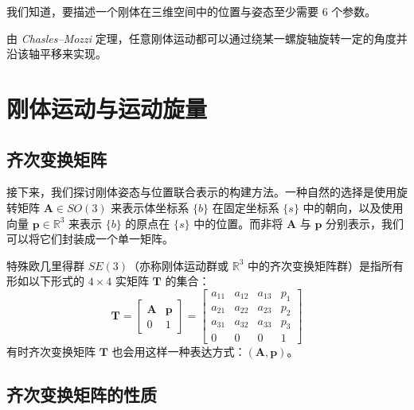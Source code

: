 
我们知道，要描述一个刚体在三维空间中的位置与姿态至少需要 6 个参数。

由 \textit{Chasles--Mozzi} 定理，任意刚体运动都可以通过绕某一螺旋轴旋转一定的角度并沿该轴平移来实现。

\section{刚体运动与运动旋量}

\subsection{齐次变换矩阵}

接下来，我们探讨刚体姿态与位置联合表示的构建方法。一种自然的选择是使用旋转矩阵 $\boldsymbol{A}\in SO(3)$ 来表示体坐标系 $\{b\}$ 在固定坐标系 $\{s\}$ 中的朝向，以及使用向量 $\boldsymbol{p}\in\mathbb{R}^{3}$ 来表示 $\{b\}$ 的原点在 $\{s\}$ 中的位置。而非将 $\boldsymbol{A}$ 与 $\boldsymbol{p}$ 分别表示，我们可以将它们封装成一个单一矩阵。

\begin{definition}[特殊欧几里得群 $SE(3)$]
	特殊欧几里得群 $SE(3)$（亦称刚体运动群或 $\mathbb{R}^{3}$ 中的齐次变换矩阵群）是指所有形如以下形式的 $4\times4$ 实矩阵 $\boldsymbol{T}$ 的集合：
	\begin{equation}
		\label{eq:齐次变换:SE3}
		\boldsymbol{T}=\begin{bmatrix}
			\boldsymbol{A} & \boldsymbol{p}\\
			0 & 1
		\end{bmatrix}=\begin{bmatrix}
			a_{11} & a_{12} & a_{13} & p_{1}\\
			a_{21} & a_{22} & a_{23} & p_{2}\\
			a_{31} & a_{32} & a_{33} & p_{3}\\
			0 & 0 & 0 & 1
		\end{bmatrix}
	\end{equation}
	有时齐次变换矩阵 $\boldsymbol{T}$ 也会用这样一种表达方式：$(\boldsymbol{A},\boldsymbol{p})$。
\end{definition}

\subsection{齐次变换矩阵的性质}

